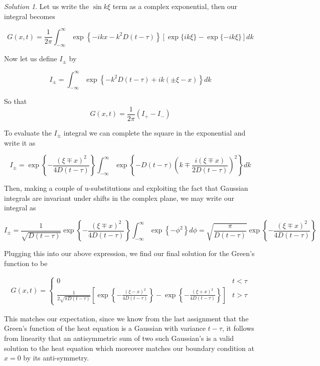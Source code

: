 \documentclass[12pt,a4paper]{article}
\theoremstyle{definition}
\theoremstyle{remark}
\newtheorem*{solution}{Solution}
\begin{document}
\begin{solution}
    Let us write the $\sin k \xi$ term as a complex exponential, then our integral becomes 

    $$G(x,t) = \frac{1}{2 \pi} \int_{-\infty}^\infty  \exp \left\{ -ikx -k^2 D(t-\tau) \right\} \left[ \exp\{ ik \xi \} - \exp \{ -ik\xi \} \right]dk$$

    Now let us define $I_{\pm}$ by 

    $$I_{\pm} = \int_{-\infty}^\infty \exp \left\{ -k^2 D(t-\tau) + i k ( \pm \xi - x) \right\} dk$$

    So that $$G(x,t) = \frac{1}{2 \pi} \left( I_+ - I_-\right)$$

    To evaluate the $I_\pm$ integral we can complete the square in the exponential and write it as 

    $$I_\pm = \exp \left\{ - \frac{(\xi \mp x)^2}{4D(t-\tau)} \right\} \int_{-\infty}^\infty \exp\left\{ -D(t-\tau) \left( k \mp \frac{i (\xi \mp x)}{2D(t-\tau)} \right)^2 \right\} dk$$

    Then, making a couple of u-substitutions and exploiting the fact that Gaussian integrals are invariant under shifts in the complex plane, we may write our integral as 

    $$I_\pm = \frac{1}{\sqrt{D(t-\tau)}} \exp \left\{ - \frac{(\xi \mp x)^2}{4D(t-\tau)} \right\} \int_{-\infty}^\infty \exp \left\{ - \phi^2 \right\} d\phi = \sqrt{\frac{\pi}{D(t-\tau)}} \exp \left\{ - \frac{(\xi \mp x)^2}{4D(t-\tau)} \right\}$$

    Plugging this into our above expression, we find our final solution for the Green's function to be 

    \begin{align*}
        G(x,t) = \begin{cases} 0 & t < \tau \\ \frac{1}{2 \sqrt{\pi D(t-\tau)}} \left[\exp \left\{ - \frac{(\xi - x)^2}{4D(t-\tau)} \right\} - \exp \left\{ - \frac{(\xi + x)^2}{4D(t-\tau)} \right\} \right] & t > \tau \end{cases}
    \end{align*}

    This matches our expectation, since we know from the last assignment that the Green's function of the heat equation is a Gaussian with variance $t-\tau$, it follows from linearity that an antisymmetric sum of two such Gaussian's is a valid solution to the heat equation which moreover matches our boundary condition at $x=0$ by its anti-symmetry. 
\end{solution}
\end{document}
